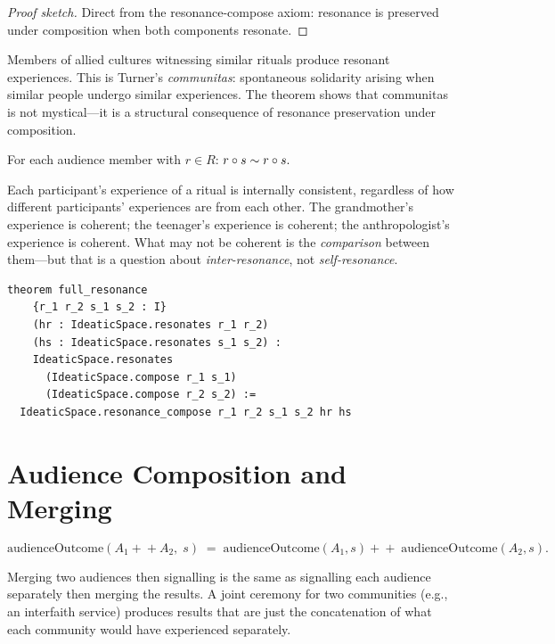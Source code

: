 \begin{proof}[Proof sketch]
Direct from the resonance-compose axiom: resonance is preserved under
composition when both components resonate.
\end{proof}

Members of allied cultures witnessing similar rituals produce resonant
experiences.  This is Turner's \emph{communitas}: spontaneous solidarity
arising when similar people undergo similar experiences.  The theorem shows
that communitas is not mystical---it is a structural consequence of
resonance preservation under composition.

\begin{theorem}
\label{thm:audience-self-resonance}
For each audience member with $r\in R$:
$r\circ s \sim r\circ s.$
\end{theorem}

Each participant's experience of a ritual is internally consistent,
regardless of how different participants' experiences are from each other.
The grandmother's experience is coherent; the teenager's experience is
coherent; the anthropologist's experience is coherent.  What may not be
coherent is the \emph{comparison} between them---but that is a question
about \emph{inter-resonance}, not \emph{self-resonance}.

\begin{lstlisting}[caption={Full resonance theorem in Lean~4.}]
theorem full_resonance
    {r_1 r_2 s_1 s_2 : I}
    (hr : IdeaticSpace.resonates r_1 r_2)
    (hs : IdeaticSpace.resonates s_1 s_2) :
    IdeaticSpace.resonates
      (IdeaticSpace.compose r_1 s_1)
      (IdeaticSpace.compose r_2 s_2) :=
  IdeaticSpace.resonance_compose r_1 r_2 s_1 s_2 hr hs
\end{lstlisting}


\section{Audience Composition and Merging}
\label{sec:mr-merging}

\begin{theorem}
\label{thm:audience-concat}
\[
  \mathrm{audienceOutcome}(A_1\!+\!+\!A_2,\; s)
  \;=\;
  \mathrm{audienceOutcome}(A_1, s)\!+\!+\;\mathrm{audienceOutcome}(A_2, s).
\]
\end{theorem}

Merging two audiences then signalling is the same as signalling each
audience separately then merging the results.  A joint ceremony for two
communities (e.g., an interfaith service) produces results that are just the
concatenation of what each community would have experienced separately.

